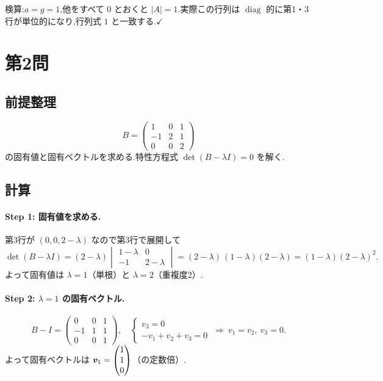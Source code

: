 \documentclass[11pt,a4paper]{article}
\begin{document}
検算:$a=g=1$,他をすべて $0$ とおくと $|A|=1$.実際この行列は
$\operatorname{diag}$ 的に第1・3行が単位的になり,行列式 $1$ と一致する.$\checkmark$

\section*{第2問}

\subsection*{前提整理}

\[
B=\begin{pmatrix}1&0&1\\-1&2&1\\0&0&2\end{pmatrix}
\]
の固有値と固有ベクトルを求める.特性方程式 $\det(B-\lambda I)=0$ を解く.

\subsection*{計算}

\paragraph{Step 1: 固有値を求める.}
第3行が $(0,0,2-\lambda)$ なので第3行で展開して
\[
\det(B-\lambda I)
=(2-\lambda)\begin{vmatrix}1-\lambda&0\\-1&2-\lambda\end{vmatrix}
=(2-\lambda)\,(1-\lambda)(2-\lambda)=(1-\lambda)(2-\lambda)^2.
\]
よって固有値は $\lambda=1$（単根）と $\lambda=2$（重複度2）.

\paragraph{Step 2: $\lambda=1$ の固有ベクトル.}
\[
B-I=\begin{pmatrix}0&0&1\\-1&1&1\\0&0&1\end{pmatrix},\quad
\begin{cases}v_3=0\\ -v_1+v_2+v_3=0\end{cases}
\ \Rightarrow\ v_1=v_2,\ v_3=0.
\]
よって固有ベクトルは $\bm{v}_1=\begin{pmatrix}1\\1\\0\end{pmatrix}$（の定数倍）.
\end{document}
